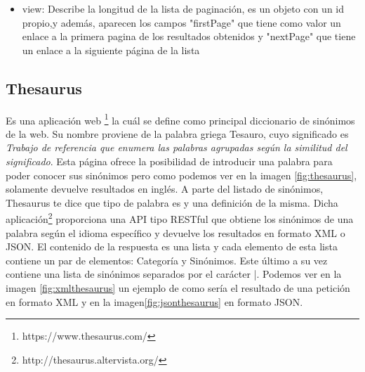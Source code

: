 \begin{itemize}
\begin{itemize}
		\item sources: Indica por qué ConceptNet guarda esa información, este campo como los anteriores, es un objeto que tiene su propio id, además de un campo \textit{activity} indicando la tarea del contribuidor que ha añadido esta palabra o si ha sido añadida mediante un proceso automático. Por último, hay un campo \textit{contributor}, en el que aparece el nombre de la persona que ha añadido esta palabra.
		\item start: Describe el nodo origen, es decir, la palabra que hemos introducido en ConceptNet para que haga la consulta, este campo esta compuesto por elementos ya descritos como son: @id, @type, label, language y term.
		\item surfaceText: Indica de que frase del lenguaje natural se han extraido los datos que estan guardados en conceptnet. En nuestro caso es nulo.
		\item weight: Indica la fiabilidad de la información guardada en conceptnet, siendo normal que su valor sea 1.0. Cuanto mayor sea este valor, más fiables serán.
	\end{itemize}
	\item view: Describe la longitud de la lista de paginación, es un objeto con un id propio,y además, aparecen los campos "firstPage" que tiene como valor un enlace a la primera pagina de los resultados obtenidos y "nextPage" que tiene un enlace a la siguiente página de la lista
\end{itemize}


\subsection{Thesaurus}
\label{cap:subsec:thesaurus}
Es una aplicación web \footnote{https://www.thesaurus.com/} la cuál se define como principal diccionario de sinónimos de la web. Su nombre proviene de la palabra griega Tesauro, cuyo significado es \textit{Trabajo de referencia que enumera las palabras agrupadas según la similitud del significado}. Esta página ofrece la posibilidad de introducir una palabra para poder conocer sus sinónimos pero como podemos ver en la imagen \ref{fig:thesaurus}, solamente devuelve resultados en inglés. A parte del listado de sinónimos,  Thesaurus te dice que tipo de palabra es y una definición de la misma.
Dicha aplicación\footnote{http://thesaurus.altervista.org/} proporciona una API tipo RESTful  que obtiene los sinónimos de una palabra según el idioma específico y devuelve los resultados en formato XML o JSON. El contenido de la respuesta es una lista y cada elemento de esta lista contiene un par de elementos: Categoría y Sinónimos. Este último a su vez contiene una lista de sinónimos separados por el carácter |. 
Podemos ver en la imagen \ref{fig:xmlthesaurus} un ejemplo de como sería el resultado de una petición en formato XML y en la imagen\ref{fig:jsonthesaurus} en formato JSON.

